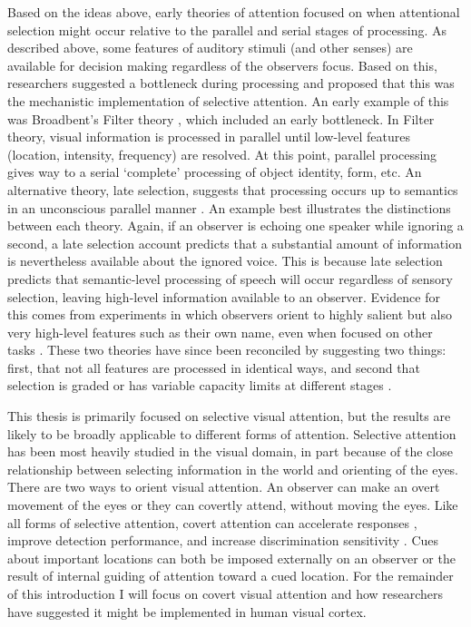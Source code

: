 Based on the ideas above, early theories of attention focused on when attentional selection might occur relative to the parallel and serial stages of processing. As described above, some features of auditory stimuli (and other senses) are available for decision making regardless of the observers focus. Based on this, researchers suggested a bottleneck during processing and proposed that this was the mechanistic implementation of selective attention. An early example of this was Broadbent’s Filter theory \citep{Broadbent1958-ny}, which included an early bottleneck. In Filter theory, visual information is processed in parallel until low-level features (location, intensity, frequency) are resolved. At this point, parallel processing gives way to a serial ‘complete’ processing of object identity, form, etc. An alternative theory, late selection, suggests that processing occurs up to semantics in an unconscious parallel manner \citep{Deutsch1963-ac}. An example best illustrates the distinctions between each theory. Again, if an observer is echoing one speaker while ignoring a second, a late selection account predicts that a substantial amount of information is nevertheless available about the ignored voice. This is because late selection predicts that semantic-level processing of speech will occur regardless of sensory selection, leaving high-level information available to an observer. Evidence for this comes from experiments in which observers orient to highly salient but also very high-level features such as their own name, even when focused on other tasks \citep{Moray1959-fn}. These two theories have since been reconciled by suggesting two things: first, that not all features are processed in identical ways, and second that selection is graded \citep{Treisman1960-qs} or has variable capacity limits at different stages \citep{Kahneman1973-af}.

This thesis is primarily focused on selective visual attention, but the results are likely to be broadly applicable to different forms of attention. Selective attention has been most heavily studied in the visual domain, in part because of the close relationship between selecting information in the world and orienting of the eyes. There are two ways to orient visual attention. An observer can make an overt movement of the eyes or they can covertly attend, without moving the eyes. Like all forms of selective attention, covert attention can accelerate responses \citep{Eriksen1972-qj,Posner1980-cr}, improve detection performance, and increase discrimination sensitivity \citep{Carrasco2011-xp}. Cues about important locations can both be imposed externally on an observer \citep{Posner1980-wb} or the result of internal guiding of attention toward a cued location. For the remainder of this introduction I will focus on covert visual attention and how researchers have suggested it might be implemented in human visual cortex.

